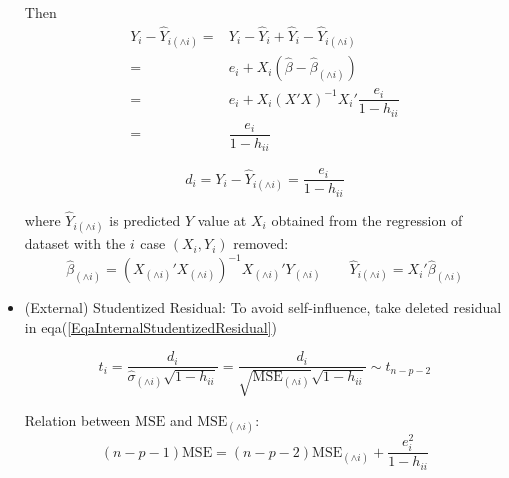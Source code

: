 \begin{itemize}[topsep=2pt,itemsep=2pt]
{        Then 
            \begin{align*}
            Y_i-\hat{Y}_{i(\wedge i)}=&Y_i-\hat{Y}_i+\hat{Y}_i-\hat{Y}_{i(\wedge i)}\\
            =&e_i+X_i(\hat{\beta }-\hat{\beta }_{(\wedge i)})\\
            =&e_i+X_i(X'X)^{-1}X_i'\dfrac{e_i}{1-h_{ii}}\\
            =&\dfrac{e_i}{1-h_{ii}} 
        \end{align*}

    }


    \begin{equation}\label{EqaEstimatorWithWedgeX}
        d_i=Y_i-\hat{Y}_{i(\wedge i)} =\dfrac{e_i}{1-h_{ii}}
    \end{equation}

    where $ \hat{Y}_{i(\wedge i)} $ is predicted $ Y $ value at $ X_i $ obtained from the regression of dataset with the $ i^\mathrm{} $ case $ (X_i,Y_i) $ removed:
    \[
         \hat{\beta} _{(\wedge i)}=(X_{(\wedge i)}'X_{(\wedge i)})^{-1}X_{(\wedge i)}'Y_{(\wedge i)}\qquad \hat{Y}_{i(\wedge i)}=X_i'\hat{\beta} _{(\wedge i)}
    \]
        
    \item (External) Studentized Residual: To avoid self-influence, take deleted residual in eqa(\ref{EqaInternalStudentizedResidual})
    
    \begin{equation}
         t_i=\dfrac{d_i}{\hat{\sigma} _{(\wedge i)}\sqrt{1-h_{ii}}}= \dfrac{d_i}{\sqrt{\mathrm{MSE}_{(\wedge i)} }\sqrt{1-h_{ii}}}\sim t_{n-p-2}
    \end{equation}

    Relation between $ \mathrm{MSE}  $ and $ \mathrm{MSE}_{(\wedge i)}  $:
    \[
        (n-p-1)\mathrm{MSE}=(n-p-2)\mathrm{MSE}_{(\wedge i)}+\dfrac{e_i^2}{1-h_{ii}}   
    \]
    
    
    
\end{itemize}



